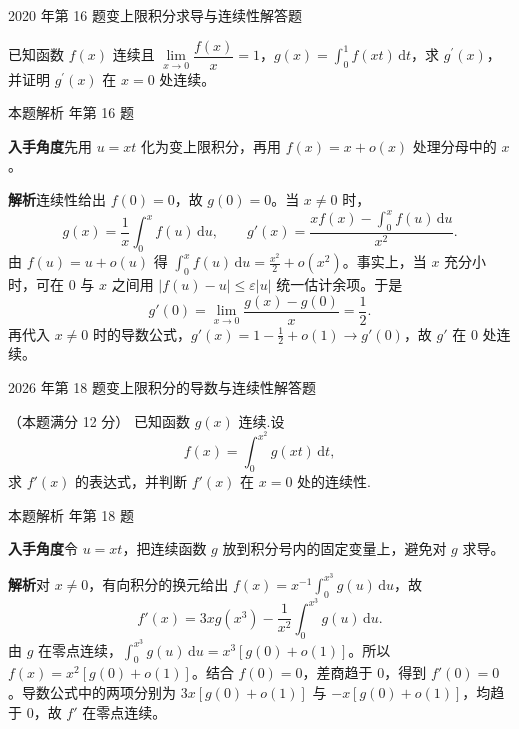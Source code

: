 \documentclass[UTF8,zihao=-4,fontset=fandol]{ctexart}
\renewcommand{\lim}{\operatorname*{lim}\limits}
\newcommand{\QuestionPage}[6]{%
  \par\noindent\begin{minipage}{\linewidth}
  \raggedright
  {\small\textcolor{black!60}{#3\quad #5}\hfill\textcolor{accent}{#2}}\par\smallskip}
\newcommand{\QuestionEnd}{\end{minipage}\par\medskip}
\newcommand{\QuestionPage}[6]{%
  \clearpage
  {\small\textcolor{accent}{#1\hfill #2}}\par\medskip
  {\small\textcolor{black!60}{#3\quad #5\hfill #6}}\par\vspace{9bp}}
\newcommand{\QuestionEnd}{}
\newenvironment{QuestionSolution}[1]{%
  \clearpage
  {\small\textcolor{black!60}{本题解析\quad #1}}\par\medskip
}{\par\clearpage}
\begin{document}
\QuestionPage{3.2 微积分基本公式与基本定理}{解答题}{2020 年第 16 题}{2}{变上限积分求导与连续性}{150 / 234}
已知函数 \(f\left( x \right)\) 连续且 \(\lim_{x\to 0}{\dfrac{f\left( x \right)}{x}} = 1\)，\(g\left( x \right)=\int_{0}^{1}{f\left( xt \right) \,\mathrm{d} t}\)，求 \(g^{\prime}\left( x \right)\)，并证明 \(g^{\prime}\left( x \right)\) 在 \(x=0\) 处连续。
\QuestionEnd

\begin{QuestionSolution}{2020 年第 16 题}
\textbf{入手角度}\quad 先用 \(u=xt\) 化为变上限积分，再用 \(f(x)=x+o(x)\) 处理分母中的 \(x\)。

\textbf{解析}\quad 连续性给出 \(f(0)=0\)，故 \(g(0)=0\)。当 \(x\ne0\) 时，
\[
g(x)=\frac1x\int_0^x f(u)\,\mathrm{d}u,\qquad
g'(x)=\frac{xf(x)-\int_0^x f(u)\,\mathrm{d}u}{x^2}.
\]
由 \(f(u)=u+o(u)\) 得 \(\int_0^x f(u)\,\mathrm{d}u=\frac{x^2}{2}+o(x^2)\)。事实上，当 \(x\) 充分小时，可在 \(0\) 与 \(x\) 之间用 \(|f(u)-u|\le\varepsilon |u|\) 统一估计余项。于是
\[
g'(0)=\lim_{x\to0}\frac{g(x)-g(0)}{x}=\frac12 .
\]
再代入 \(x\ne0\) 时的导数公式，\(g'(x)=1-\frac{1}{2}+o(1)\to g'(0)\)，故 \(g'\) 在 \(0\) 处连续。
\end{QuestionSolution}

\QuestionPage{3.2 微积分基本公式与基本定理}{解答题}{2026 年第 18 题}{2}{变上限积分的导数与连续性}{151 / 234}
（本题满分 12 分）
已知函数 \(g(x)\) 连续.设
\[f(x)=\int_0^{x^2} g(xt)\,\mathrm{d}t,
\]
求 \(f'(x)\) 的表达式，并判断 \(f'(x)\) 在 \(x=0\) 处的连续性.
\QuestionEnd

\begin{QuestionSolution}{2026 年第 18 题}
\textbf{入手角度}\quad 令 \(u=xt\)，把连续函数 \(g\) 放到积分号内的固定变量上，避免对 \(g\) 求导。

\textbf{解析}\quad 对 \(x\ne0\)，有向积分的换元给出 \(f(x)=x^{-1}\int_0^{x^3}g(u)\,\mathrm{d}u\)，故
\[
f'(x)=3xg(x^3)-\frac1{x^2}\int_0^{x^3} g(u)\,\mathrm{d}u.
\]
由 \(g\) 在零点连续，\(\int_0^{x^3}g(u)\,\mathrm{d}u=x^3[g(0)+o(1)]\)。所以 \(f(x)=x^2[g(0)+o(1)]\)。结合 \(f(0)=0\)，差商趋于 \(0\)，得到 \(f'(0)=0\)。导数公式中的两项分别为 \(3x[g(0)+o(1)]\) 与 \(-x[g(0)+o(1)]\)，均趋于 \(0\)，故 \(f'\) 在零点连续。
\end{QuestionSolution}
\end{document}
